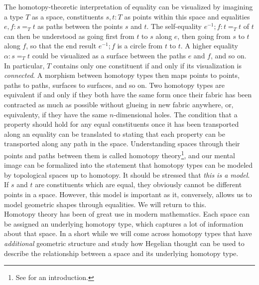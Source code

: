 \documentclass{article}
\begin{document}
The homotopy-theoretic interpretation of equality can be visualized by imagining a type $T$ as a space, constituents $s,t:T$ as points within this space and equalities $e,f:s=_T t$ as paths between the points $s$ and $t$. The self-equality $e^{-1};f:t=_T t$ of $t$ can then be understood as going first from $t$ to $s$ along $e$, then going from $s$ to $t$ along $f$, so that the end result $e^{-1};f$ is a circle from $t$ to $t$. A higher equality $\alpha:s=_T t$ could be visualized as a surface between the paths $e$ and $f$, and so on. In particular, $T$ contains only one constituent if and only if its visualization is \emph{connected}. A morphism between homotopy types then maps points to points, paths to paths, surfaces to surfaces, and so on. Two homotopy types are equivalent if and only if they both have the same form once their fabric has been contracted as much as possible without glueing in new fabric anywhere, or, equivalenty, if they have the same $n$-dimensional holes. The condition that a property should hold for any equal constituents once it has been transported along an equality can be translated to stating that each property can be transported along any path in the space. Understanding spaces through their points and paths between them is called homotopy theory\footnote{See \cite{Htt} for an introduction.}, and our mental image can be formalized into the statement that homotopy types can be modeled by topological spaces up to homotopy. It should be stressed that \emph{this is a model}. If $s$ and $t$ are constituents which are equal, they obviously cannot be different points in a space. However, this model is important as it, conversely, allows us to model geometric shapes through equalities. We will return to this. \\

Homotopy theory has been of great use in modern mathematics. Each space can be assigned an underlying homotopy type, which captures a lot of information about that space. In a short while we will come across homotopy types that have \emph{additional} geometric structure and study how Hegelian thought can be used to describe the relationship between a space and its underlying homotopy type. \\
\end{document}
